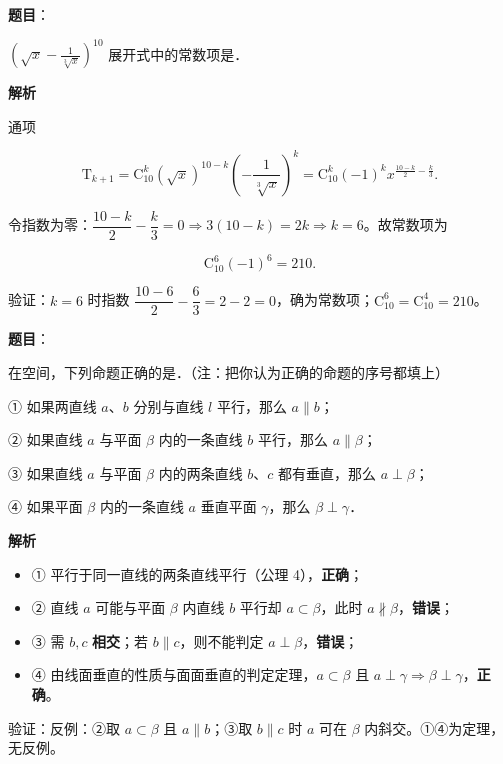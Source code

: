 \begin{answer}

\textbf{题目}：

$\left(\sqrt{x} - \frac{1}{\sqrt[3]{x}}\right)^{10}$ 展开式中的常数项是\gkblank{}．

\textbf{解析}

通项

\nopagebreak[4]
\[\mathrm T_{k+1}=\mathrm C_{10}^k(\sqrt x)^{10-k}\left(-\frac{1}{\sqrt[3]x}\right)^{k}=\mathrm C_{10}^k(-1)^k x^{\frac{10-k}{2}-\frac k3}.\]

令指数为零：$\dfrac{10-k}{2}-\dfrac k3=0\Rightarrow3(10-k)=2k\Rightarrow k=6$。故常数项为

\nopagebreak[4]
\[\mathrm C_{10}^6(-1)^6=210 .\]

验证：$k=6$ 时指数 $\dfrac{10-6}{2}-\dfrac63=2-2=0$，确为常数项；$\mathrm C_{10}^6=\mathrm C_{10}^4=210$。


\par\medskip

\end{answer}
\begin{answer}

\textbf{题目}：

在空间，下列命题正确的是\gkblank{}．（注：把你认为正确的命题的序号都填上）

① 如果两直线 $a$、$b$ 分别与直线 $l$ 平行，那么 $a \parallel b$；

② 如果直线 $a$ 与平面 $\beta$ 内的一条直线 $b$ 平行，那么 $a \parallel \beta$；

③ 如果直线 $a$ 与平面 $\beta$ 内的两条直线 $b$、$c$ 都有垂直，那么 $a \perp \beta$；

④ 如果平面 $\beta$ 内的一条直线 $a$ 垂直平面 $\gamma$，那么 $\beta \perp \gamma$．

\textbf{解析}

\begin{itemize}
\item ① 平行于同一直线的两条直线平行（公理 4），\textbf{正确}；
\item ② 直线 $a$ 可能与平面 $\beta$ 内直线 $b$ 平行却 $a\subset\beta$，此时 $a\not\parallel\beta$，\textbf{错误}；
\item ③ 需 $b,c$ \textbf{相交}；若 $b\parallel c$，则不能判定 $a\perp\beta$，\textbf{错误}；
\item ④ 由线面垂直的性质与面面垂直的判定定理，$a\subset\beta$ 且 $a\perp\gamma\Rightarrow\beta\perp\gamma$，\textbf{正确}。
\end{itemize}

验证：反例：②取 $a\subset\beta$ 且 $a\parallel b$；③取 $b\parallel c$ 时 $a$ 可在 $\beta$ 内斜交。①④为定理，无反例。


\par\medskip

\end{answer}
